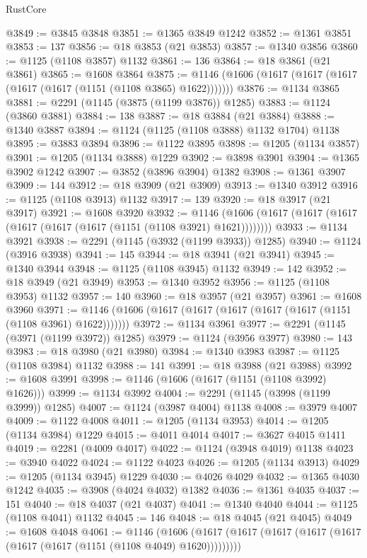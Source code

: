 \begin{lexlean}{RustCore}
\begin{coremodule}
@3849 := @3845 @3848
@3851 := @1365 @3849 @1242
@3852 := @1361 @3851
@3853 := 137
@3856 := @18 @3853 (@21 @3853)
@3857 := @1340 @3856
@3860 := @1125 (@1108 @3857) @1132
@3861 := 136
@3864 := @18 @3861 (@21 @3861)
@3865 := @1608 @3864
@3875 := @1146 (@1606 (@1617 (@1617 (@1617 (@1617 (@1617 (@1151 (@1108 @3865) @1622)))))))
@3876 := @1134 @3865
@3881 := @2291 (@1145 (@3875 (@1199 @3876)) @1285)
@3883 := @1124 (@3860 @3881)
@3884 := 138
@3887 := @18 @3884 (@21 @3884)
@3888 := @1340 @3887
@3894 := @1124 (@1125 (@1108 @3888) @1132 @1704) @1138
@3895 := @3883 @3894
@3896 := @1122 @3895
@3898 := @1205 (@1134 @3857)
@3901 := @1205 (@1134 @3888) @1229
@3902 := @3898 @3901
@3904 := @1365 @3902 @1242
@3907 := @3852 (@3896 @3904) @1382
@3908 := @1361 @3907
@3909 := 144
@3912 := @18 @3909 (@21 @3909)
@3913 := @1340 @3912
@3916 := @1125 (@1108 @3913) @1132
@3917 := 139
@3920 := @18 @3917 (@21 @3917)
@3921 := @1608 @3920
@3932 := @1146 (@1606 (@1617 (@1617 (@1617 (@1617 (@1617 (@1617 (@1151 (@1108 @3921) @1621))))))))
@3933 := @1134 @3921
@3938 := @2291 (@1145 (@3932 (@1199 @3933)) @1285)
@3940 := @1124 (@3916 @3938)
@3941 := 145
@3944 := @18 @3941 (@21 @3941)
@3945 := @1340 @3944
@3948 := @1125 (@1108 @3945) @1132
@3949 := 142
@3952 := @18 @3949 (@21 @3949)
@3953 := @1340 @3952
@3956 := @1125 (@1108 @3953) @1132
@3957 := 140
@3960 := @18 @3957 (@21 @3957)
@3961 := @1608 @3960
@3971 := @1146 (@1606 (@1617 (@1617 (@1617 (@1617 (@1617 (@1151 (@1108 @3961) @1622)))))))
@3972 := @1134 @3961
@3977 := @2291 (@1145 (@3971 (@1199 @3972)) @1285)
@3979 := @1124 (@3956 @3977)
@3980 := 143
@3983 := @18 @3980 (@21 @3980)
@3984 := @1340 @3983
@3987 := @1125 (@1108 @3984) @1132
@3988 := 141
@3991 := @18 @3988 (@21 @3988)
@3992 := @1608 @3991
@3998 := @1146 (@1606 (@1617 (@1151 (@1108 @3992) @1626)))
@3999 := @1134 @3992
@4004 := @2291 (@1145 (@3998 (@1199 @3999)) @1285)
@4007 := @1124 (@3987 @4004) @1138
@4008 := @3979 @4007
@4009 := @1122 @4008
@4011 := @1205 (@1134 @3953)
@4014 := @1205 (@1134 @3984) @1229
@4015 := @4011 @4014
@4017 := @3627 @4015 @1411
@4019 := @2281 (@4009 @4017)
@4022 := @1124 (@3948 @4019) @1138
@4023 := @3940 @4022
@4024 := @1122 @4023
@4026 := @1205 (@1134 @3913)
@4029 := @1205 (@1134 @3945) @1229
@4030 := @4026 @4029
@4032 := @1365 @4030 @1242
@4035 := @3908 (@4024 @4032) @1382
@4036 := @1361 @4035
@4037 := 151
@4040 := @18 @4037 (@21 @4037)
@4041 := @1340 @4040
@4044 := @1125 (@1108 @4041) @1132
@4045 := 146
@4048 := @18 @4045 (@21 @4045)
@4049 := @1608 @4048
@4061 := @1146
    (@1606 (@1617 (@1617 (@1617 (@1617 (@1617 (@1617 (@1617 (@1151 (@1108 @4049) @1620)))))))))

\end{coremodule}
\end{lexlean}
